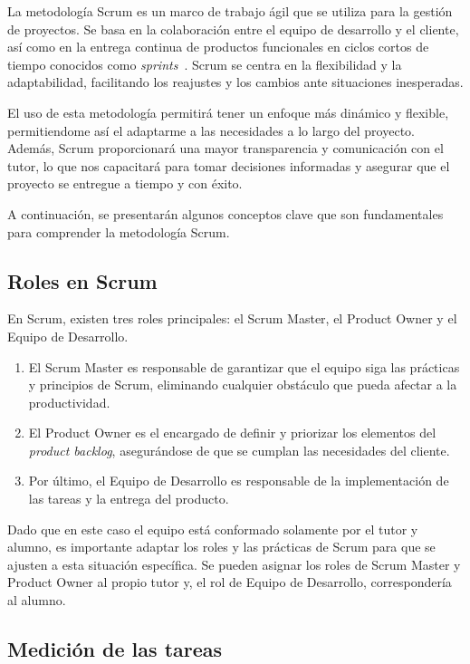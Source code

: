 La metodología Scrum es un marco de trabajo ágil que se utiliza para la gestión
de proyectos. Se basa en la colaboración entre el equipo de desarrollo y el cliente,
así como en la entrega continua de productos funcionales en ciclos cortos de
tiempo conocidos como \textit{sprints}~\cite{Palacio2022}. Scrum se centra en la
flexibilidad y la adaptabilidad, facilitando los reajustes y los cambios ante situaciones
inesperadas.

El uso de esta metodología permitirá tener un enfoque más dinámico y flexible,
permitiendome así el adaptarme a las necesidades a lo largo del proyecto. Además,
Scrum proporcionará una mayor transparencia y comunicación con el tutor, lo que nos capacitará
para tomar decisiones informadas y asegurar que el proyecto se entregue a tiempo
y con éxito.

A continuación, se presentarán algunos conceptos clave que son fundamentales
para comprender la metodología Scrum.

\subsection{Roles en Scrum}

En Scrum, existen tres roles principales: el Scrum Master, el Product Owner y el
Equipo de Desarrollo.
\begin{enumerate}
	\item El Scrum Master es responsable de garantizar que el equipo siga las prácticas
		y principios de Scrum, eliminando cualquier obstáculo que pueda afectar a la
		productividad.

	\item El Product Owner es el encargado de definir y priorizar los elementos del
		\textit{product backlog}, asegurándose de que se cumplan las necesidades del
		cliente.

	\item Por último, el Equipo de Desarrollo es responsable de la implementación
		de las tareas y la entrega del producto.
\end{enumerate}

Dado que en este caso el equipo está conformado solamente por el tutor y alumno,
es importante adaptar los roles y las prácticas de Scrum para que se ajusten a esta
situación específica. Se pueden asignar los roles de Scrum Master y Product
Owner al propio tutor y, el rol de Equipo de Desarrollo, correspondería al
alumno.

\subsection{Medición de las tareas}

